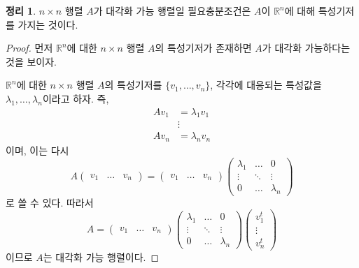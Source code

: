 \documentclass[unfonts,oneside,a4paper]{oblivoir}
\theoremstyle{definition}
\theoremstyle{theorem}
\newtheorem{theorem}{정리}[section]
\theoremstyle{theorem}
\theoremstyle{remark}
\theoremstyle{remark}
\theoremstyle{remark}
\theoremstyle{remark}
\renewcommand{\vec}[1]{\bm{\mathit{#1}}}
\begin{document}
\begin{theorem}
    $n \times n$ 행렬 $A$가 대각화 가능 행렬일 필요충분조건은 $A$이 $\mathbb R^n$에 대해 특성기저를 가지는 것이다.
\end{theorem}

\begin{proof}
    먼저 $\mathbb R^n$에 대한 $n \times n$ 행렬 $A$의 특성기저가 존재하면 $A$가 대각화 가능하다는 것을 보이자.

    $\mathbb R^n$에 대한 $n \times n$ 행렬 $A$의 특성기저를 $\{\vec v_1, \dots, \vec v_n\}$, 각각에 대응되는 특성값을 $\lambda_1, \dots, \lambda_n$이라고 하자.
    즉,
    \begin{align*}
        A\vec v_1 &= \lambda_1 \vec v_1\\
                  &\vdots\\
        A\vec v_n &= \lambda_n \vec v_n
    \end{align*}
    이며, 이는 다시
    \begin{equation*}
        A
        \begin{pmatrix}
            \vec v_1 & \dots & \vec v_n
        \end{pmatrix}
        =
        \begin{pmatrix}
            \vec v_1 & \dots & \vec v_n
        \end{pmatrix}
        \begin{pmatrix}
            \lambda_1 & \dots & 0\\
            \vdots & \ddots & \vdots\\
            0 & \dots & \lambda_n
        \end{pmatrix}
    \end{equation*}
    로 쓸 수 있다.
    따라서
    \begin{equation*}
        A
        =
        \begin{pmatrix}
            \vec v_1 & \dots & \vec v_n
        \end{pmatrix}
        \begin{pmatrix}
            \lambda_1 & \dots & 0\\
            \vdots & \ddots & \vdots\\
            0 & \dots & \lambda_n
        \end{pmatrix}
        \begin{pmatrix}
            \vec v_1^t \\ \vdots \\ \vec v_n^t
        \end{pmatrix}
    \end{equation*}
    이므로 $A$는 대각화 가능 행렬이다.


\end{proof}
\end{document}

